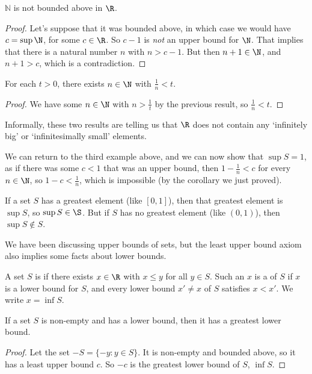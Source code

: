 \documentclass[a4paper]{scrreprt}
\begin{document}
\begin{theorem}
	$\mathbb{N}$ is not bounded above in $\R$.
\end{theorem}
\begin{proof}
	Let's suppose that it was bounded above, in which case we would have $c = \sup \N$, for some $c \in \R$. So $c - 1$ is \emph{not} an upper bound for $\N$. That implies that there is a natural number $n$ with $n > c - 1$. But then $n +1 \in \N$, and $n + 1 > c$, which is a contradiction.
\end{proof}

\begin{corollary}
	For each $t > 0$, there exists $n \in \N$ with $\frac{1}{n} < t$.
\end{corollary}
\begin{proof}
	We have some $n \in \N$ with $n > \frac{1}{t}$ by the previous result, so $\frac{1}{n} < t$.
\end{proof}

\begin{remark}
	Informally, these two results are telling us that $\R$ does not contain any `infinitely big' or `infinitesimally small' elements.
\end{remark}

We can return to the third example above, and we can now show that $\sup S = 1$, as if there was some $c < 1$ that was an upper bound, then $1 - \frac{1}{n} < c$ for every $n \in \N$, so $1 - c < \frac{1}{n}$, which is impossible (by the corollary we just proved).

\begin{remark}[Warning]
	If a set $S$ has a greatest element (like $[0, 1]$), then that greatest element is $\sup S$, so $\sup S \in \S$. But if $S$ has no greatest element (like $(0, 1)$), then $\sup S \not\in S$.
\end{remark}

We have been discussing upper bounds of sets, but the least upper bound axiom also implies some facts about lower bounds.

\begin{definition}
	A set $S$ is  if there exists $x \in \R$ with $x \leq y$ for all $y \in S$. Such an $x$ is a  of $S$ if $x$ is a lower bound for $S$, and every lower bound $x' \neq x$ of $S$ satisfies $x < x'$.
	We write $x = \inf S$.
\end{definition}

\begin{proposition}
If a set $S$ is non-empty and has a lower bound, then it has a greatest lower bound.	
\end{proposition}
\begin{proof}
	Let the set $-S = \{-y : y \in S\}$. It is non-empty and bounded above, so it has a least upper bound $c$. So $-c$ is the greatest lower bound of $S$, $\inf S$.
\end{proof}
\end{document}

